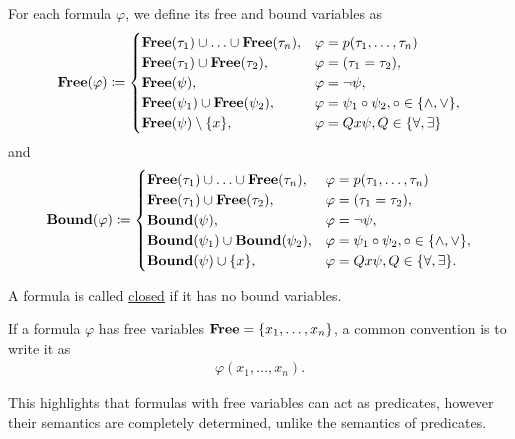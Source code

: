 \begin{definition}
  For each formula $\varphi$, we define its free and bound variables as
  \begin{align*}
    \operatorname{\mathbf{Free}}(\varphi) \coloneqq \begin{cases}
      \operatorname{\mathbf{Free}}(\tau_1) \cup \ldots \cup \operatorname{\mathbf{Free}}(\tau_n), &\varphi = p(\tau_1, \ldots, \tau_n) \\
      \operatorname{\mathbf{Free}}(\tau_1) \cup \operatorname{\mathbf{Free}}(\tau_2),             &\varphi = (\tau_1 = \tau_2), \\
      \operatorname{\mathbf{Free}}(\psi),                                        &\varphi = \neg \psi, \\
      \operatorname{\mathbf{Free}}(\psi_1) \cup \operatorname{\mathbf{Free}}(\psi_2),             &\varphi = \psi_1 \circ \psi_2, \circ \in \{ \land, \lor \}, \\
      \operatorname{\mathbf{Free}}(\psi) \setminus \{ x \},                      &\varphi = Q x \psi, Q \in \{ \forall, \exists \}
    \end{cases}
  \end{align*}
  and
  \begin{align*}
    \operatorname{\mathbf{Bound}}(\varphi) \coloneqq \begin{cases}
      \operatorname{\mathbf{Free}}(\tau_1) \cup \ldots \cup \operatorname{\mathbf{Free}}(\tau_n), &\varphi = p(\tau_1, \ldots, \tau_n) \\
      \operatorname{\mathbf{Free}}(\tau_1) \cup \operatorname{\mathbf{Free}}(\tau_2),             &\varphi = (\tau_1 = \tau_2), \\
      \operatorname{\mathbf{Bound}}(\psi),                                       &\varphi = \neg \psi, \\
      \operatorname{\mathbf{Bound}}(\psi_1) \cup \operatorname{\mathbf{Bound}}(\psi_2),           &\varphi = \psi_1 \circ \psi_2, \circ \in \{ \land, \lor \}, \\
      \operatorname{\mathbf{Bound}}(\psi) \cup \{ x \},                          &\varphi = Q x \psi, Q \in \{ \forall, \exists \}.
    \end{cases}
  \end{align*}

  A formula is called \uline{closed} if it has no bound variables.

  If a formula $\varphi$ has free variables $\operatorname{\mathbf{Free}} = \{ x_1, \ldots, x_n \}$, a common convention is to write it as
  \begin{align*}
    \varphi(x_1, \ldots, x_n).
  \end{align*}

  This highlights that formulas with free variables can act as predicates, however their semantics are completely determined, unlike the semantics of predicates.
\end{definition}


